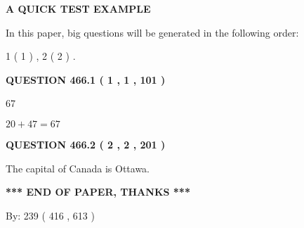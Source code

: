 \documentclass[12pt]{article}
\begin{document}
   
   
   
   
   
 \vspace{0.2in}
{\LARGE {\textbf{ A QUICK TEST EXAMPLE}}}
   
   
   
\vspace{0.2in}
   
In this paper, big questions will be generated in the following order: 
   
   
   1 ( 1 )
 ,
   2 ( 2 )
 .
  
\vspace{0.2in}
  
{\textbf{\Large{QUESTION
466.1 
 ( 1 , 1 , 101 )
}}}
  
  
 
 
\noindent{}

67
 
 
 
 
\noindent{}

$ %
20 +  %
47=   %
67$
 
 
  
\vspace{0.2in}
  
{\textbf{\Large{QUESTION
466.2 
 ( 2 , 2 , 201 )
}}}
  
  
 
 
\noindent{}
 
 
The capital of Canada is Ottawa.
 
 
 
 
   
   
 \vspace{0.2in}
 
   
   
   
   
\vspace{1.0in} 
{\textbf{\large{ *** END OF PAPER, THANKS *** }}} 
   
   
\hspace{1.0in} By: 
 239 ( 416 ,  613 )
   
   
   
   
\newpage 
\setcounter{page}{ 
   467001 } 
   
   
   
\end{document}
